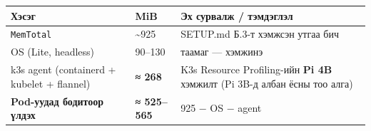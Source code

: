 \begingroup\scriptsize\begin{longtable}[]{@{}lll@{}}
\toprule
\begin{minipage}[b]{0.30\columnwidth}\raggedright
Хэсэг\strut
\end{minipage} & \begin{minipage}[b]{0.30\columnwidth}\raggedright
MiB\strut
\end{minipage} & \begin{minipage}[b]{0.30\columnwidth}\raggedright
Эх сурвалж / тэмдэглэл\strut
\end{minipage}\tabularnewline
\midrule
\endhead
\begin{minipage}[t]{0.30\columnwidth}\raggedright
\texttt{MemTotal}\strut
\end{minipage} & \begin{minipage}[t]{0.30\columnwidth}\raggedright
\textasciitilde925\strut
\end{minipage} & \begin{minipage}[t]{0.30\columnwidth}\raggedright
SETUP.md Б.3-т хэмжсэн утгаа бич\strut
\end{minipage}\tabularnewline
\begin{minipage}[t]{0.30\columnwidth}\raggedright
OS (Lite, headless)\strut
\end{minipage} & \begin{minipage}[t]{0.30\columnwidth}\raggedright
90--130\strut
\end{minipage} & \begin{minipage}[t]{0.30\columnwidth}\raggedright
таамаг --- хэмжинэ\strut
\end{minipage}\tabularnewline
\begin{minipage}[t]{0.30\columnwidth}\raggedright
k3s agent (containerd + kubelet + flannel)\strut
\end{minipage} & \begin{minipage}[t]{0.30\columnwidth}\raggedright
\textbf{≈ 268}\strut
\end{minipage} & \begin{minipage}[t]{0.30\columnwidth}\raggedright
K3s Resource Profiling-ийн \textbf{Pi 4B} хэмжилт (Pi 3B-д албан ёсны тоо алга)\strut
\end{minipage}\tabularnewline
\begin{minipage}[t]{0.30\columnwidth}\raggedright
\textbf{Pod-уудад бодитоор үлдэх}\strut
\end{minipage} & \begin{minipage}[t]{0.30\columnwidth}\raggedright
\textbf{≈ 525--565}\strut
\end{minipage} & \begin{minipage}[t]{0.30\columnwidth}\raggedright
925 − OS − agent\strut
\end{minipage}\tabularnewline
\bottomrule
\end{longtable}\endgroup

